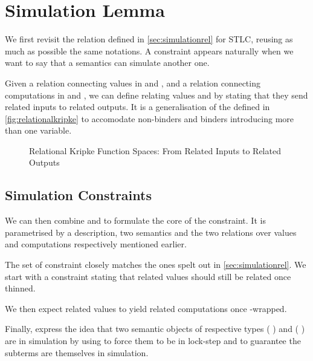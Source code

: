 \section{Simulation Lemma}\label{section:simulation}

We first revisit the  relation defined in \cref{sec:simulationrel}
for STLC, reusing as much as possible the same notations. A  constraint
appears naturally when we want to say that a semantics can simulate another one.

Given a relation  connecting values in  and , and a relation
 connecting computations in  and , we can define 
relating values    and    by
stating that they send related inputs to related outputs. It is a generalisation of
the  defined in \cref{fig:relationalkripke} to accomodate non-binders
and binders introducing more than one variable.

\begin{figure}[h]
\caption{Relational Kripke Function Spaces: From Related Inputs to Related Outputs}
\end{figure}

\subsection{Simulation Constraints}

We can then combine  and  to formulate the
core of the  constraint. It is parametrised by a description, two
semantics and the two relations over values and computations respectively mentioned
earlier.


The set of constraint closely matches the ones spelt out in \cref{sec:simulationrel}.
We start with a constraint  stating that related values should still be
related once thinned.


We then expect related values to yield related computations once -wrapped.


Finally,  express the idea that two semantic objects of respective types
   (  )
and    (  ) are in simulation by using
 to force them to be in lock-step and  to guarantee the subterms
are themselves in simulation.

